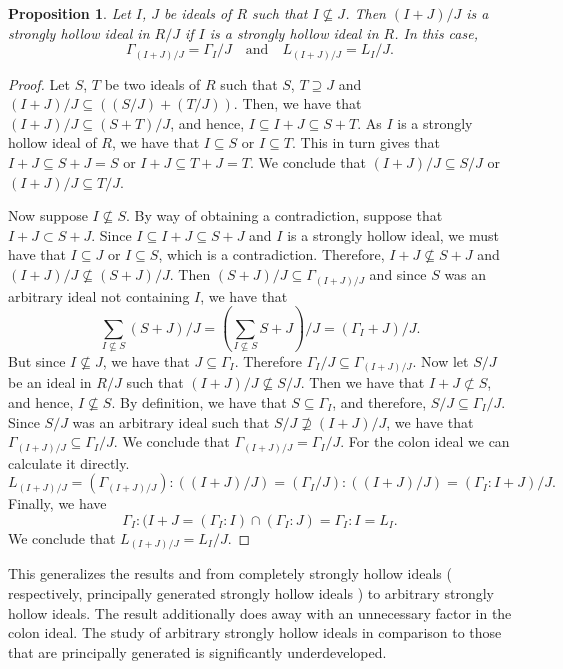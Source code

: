 \documentclass[11pt,english]{amsart}
\newtheorem{proposition}[theorem]{Proposition}
\theoremstyle{definition}
\numberwithin{equation}{section}
\theoremstyle{remark}
\begin{document}
\begin{proposition}
Let $I$, $J$ be ideals of $R$ such that $I\not\subseteq J$. Then $(I+J)/J$ is a strongly hollow ideal in $R/J$ if $I$ is a strongly hollow ideal in $R$. In this case, \[\Gamma_{(I+J)/J}=\Gamma_I/J\quad \text{and}\quad L_{(I+J)/J}=L_I/J.\]
\end{proposition}
\begin{proof}
Let $S$, $T$ be two ideals of $R$ such that $S$, $T\supseteq J$ and $(I+J)/J\subseteq ((S/J)+(T/J))$. Then, we have that $(I+J)/J\subseteq (S+T)/J$, and hence, $I\subseteq I+J\subseteq S+T$. As $I$ is a strongly hollow ideal of $R$, we have that $I\subseteq S$ or $I\subseteq T$. This in turn gives that $I+J\subseteq S+J=S$ or $I+J\subseteq T+J=T$. We conclude that $(I+J)/J\subseteq S/J$ or $(I+J)/J\subseteq T/J$. 

Now suppose $I\not\subseteq S$. By way of obtaining a contradiction, suppose that $I+J\subset S+J$. Since $I\subseteq I+J\subseteq S+J$ and $I$ is a strongly hollow ideal, we must have that $I\subseteq J$ or $I\subseteq S$, which is a contradiction. Therefore, $I+J\not\subseteq S+J$ and $(I+J)/J\not\subseteq (S+J)/J$. Then $(S+J)/J\subseteq \Gamma_{(I+J)/J} $ and since $S$ was an arbitrary ideal not containing $I$, we have that \[\sum_{I\not\subseteq S}(S+J)/J=\left(\sum_{I\not\subseteq S}S+J\right)/J=(\Gamma_I+J)/J.\] But since $I\not\subseteq J$, we have that $J\subseteq \Gamma_I$. Therefore $\Gamma_I/J\subseteq \Gamma_{(I+J)/J}$. Now let $S/J$ be an ideal in $R/J$ such that $(I+J)/J\not\subseteq S/J$. Then we have that $I+J\not\subset S$, and hence, $I\not\subseteq S$. By definition, we have that $S\subseteq \Gamma_I$, and therefore, $S/J\subseteq\Gamma_I/J$. Since $S/J$ was an arbitrary ideal such that $S/J\not\supseteq (I+J)/J$, we have that $\Gamma_{(I+J)/J}\subseteq\Gamma_I/J$. We conclude that $\Gamma_{(I+J)/J}=\Gamma_I/J$. For the colon ideal we can calculate it directly. $$L_{(I+J)/J}=(\Gamma_{(I+J)/J}):\left((I+J)/J\right)=(\Gamma_I/J):((I+J)/J)=(\Gamma_I:I+J)/J.$$
Finally, we have \[\Gamma_I:(I+J=(\Gamma_I:I)\cap(\Gamma_I:J)=\Gamma_I:I=L_I.\] We conclude that $L_{(I+J)/J}=L_I/J$. 
\end{proof}
This generalizes the results \cite[Proposition.~3.21]{Ceken-Yuksel} and \cite[Proposition.~1.19]{Rostami2021} from completely strongly hollow ideals ( respectively, principally generated strongly hollow ideals ) to arbitrary strongly hollow ideals. The result additionally does away with an unnecessary factor in the colon ideal. The study of arbitrary strongly hollow ideals in comparison to those that are principally generated is significantly underdeveloped.
\end{document}
